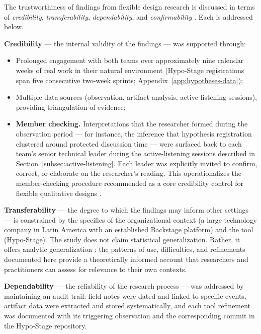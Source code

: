 The trustworthiness of findings from flexible design research is discussed in terms of \emph{credibility}, \emph{transferability},
\emph{dependability}, and \emph{confirmability} \citep{robson2016}. Each is addressed
below.

\textbf{Credibility} --- the internal validity of the findings --- was supported
through: 
\begin{itemize}
  \item[(i)] Prolonged engagement with both teams over approximately nine calendar weeks of real work in their natural environment (Hypo-Stage registrations span five consecutive two-week sprints; Appendix~\ref{app:hypotheses-data});
  \item[(ii)] Multiple data sources (observation, artifact analysis, active listening sessions), providing triangulation of evidence;
  \item[(iii)] \textbf{Member checking.} Interpretations that the researcher
    formed during the observation period --- for instance, the inference that
    hypothesis registration clustered around protected discussion time ---
    were surfaced back to each team's senior technical leader during the
    active-listening sessions described in
    Section~\ref{subsec:active-listening}. Each leader was explicitly invited
    to confirm, correct, or elaborate on the researcher's reading. This
    operationalizes the member-checking procedure recommended as a core credibility control for flexible qualitative
    designs \citep{robson2016}.
\end{itemize}

\textbf{Transferability} --- the degree to which the findings may inform other
settings --- is constrained by the specifics of the organizational context (a large
technology company in Latin America with an established Backstage platform) and the
tool (Hypo-Stage). The study does not claim statistical generalization. Rather, it
offers analytic generalization \citep{robson2016,yin2009}: the patterns of use,
difficulties, and refinements documented here provide a theoretically informed
account that researchers and practitioners can assess for relevance to their own
contexts.

\textbf{Dependability} --- the reliability of the research process --- was addressed
by maintaining an audit trail: field notes were dated and linked to specific events,
artifact data were extracted and stored systematically, and each tool refinement was
documented with its triggering observation and the corresponding commit in the
Hypo-Stage repository.

